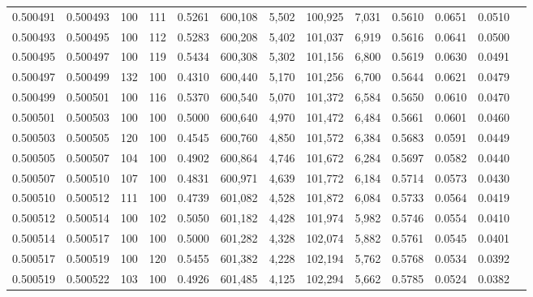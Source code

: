 \begin{tabular}{rrrrrrrrrrrrr}
0.500491 & 0.500493 &   100 & 111 &                                     0.5261 & 600,108 &   5,502 & 100,925 &   7,031 & 0.5610 & 0.0651 & 0.0510 \\
0.500493 & 0.500495 &   100 & 112 &                                     0.5283 & 600,208 &   5,402 & 101,037 &   6,919 & 0.5616 & 0.0641 & 0.0500 \\
0.500495 & 0.500497 &   100 & 119 &                                     0.5434 & 600,308 &   5,302 & 101,156 &   6,800 & 0.5619 & 0.0630 & 0.0491 \\
0.500497 & 0.500499 &   132 & 100 &                                     0.4310 & 600,440 &   5,170 & 101,256 &   6,700 & 0.5644 & 0.0621 & 0.0479 \\
0.500499 & 0.500501 &   100 & 116 &                                     0.5370 & 600,540 &   5,070 & 101,372 &   6,584 & 0.5650 & 0.0610 & 0.0470 \\
0.500501 & 0.500503 &   100 & 100 &                                     0.5000 & 600,640 &   4,970 & 101,472 &   6,484 & 0.5661 & 0.0601 & 0.0460 \\
0.500503 & 0.500505 &   120 & 100 &                                     0.4545 & 600,760 &   4,850 & 101,572 &   6,384 & 0.5683 & 0.0591 & 0.0449 \\
0.500505 & 0.500507 &   104 & 100 &                                     0.4902 & 600,864 &   4,746 & 101,672 &   6,284 & 0.5697 & 0.0582 & 0.0440 \\
0.500507 & 0.500510 &   107 & 100 &                                     0.4831 & 600,971 &   4,639 & 101,772 &   6,184 & 0.5714 & 0.0573 & 0.0430 \\
0.500510 & 0.500512 &   111 & 100 &                                     0.4739 & 601,082 &   4,528 & 101,872 &   6,084 & 0.5733 & 0.0564 & 0.0419 \\
0.500512 & 0.500514 &   100 & 102 &                                     0.5050 & 601,182 &   4,428 & 101,974 &   5,982 & 0.5746 & 0.0554 & 0.0410 \\
0.500514 & 0.500517 &   100 & 100 &                                     0.5000 & 601,282 &   4,328 & 102,074 &   5,882 & 0.5761 & 0.0545 & 0.0401 \\
0.500517 & 0.500519 &   100 & 120 &                                     0.5455 & 601,382 &   4,228 & 102,194 &   5,762 & 0.5768 & 0.0534 & 0.0392 \\
0.500519 & 0.500522 &   103 & 100 &                                     0.4926 & 601,485 &   4,125 & 102,294 &   5,662 & 0.5785 & 0.0524 & 0.0382 \\

\end{tabular}
